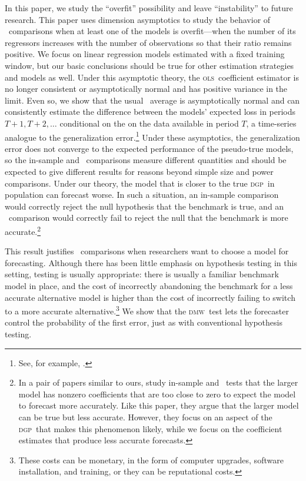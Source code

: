 \documentclass[11pt]{article}
\newcommand{\dmw}{\textsc{dmw}}
\newcommand{\ols}{\textsc{ols}}
\newcommand{\dgp}{\textsc{dgp}}
\begin{document}
In this paper, we study the ``overfit'' possibility and leave
``instability'' to future research. This paper uses dimension
asymptotics to study the behavior of \oos\ comparisons when at least
one of the models is overfit---when the number of its regressors
increases with the number of observations so that their ratio remains
positive.  We focus on linear regression models estimated with a fixed
training window, but our basic conclusions should be true for other
estimation strategies and models as well.  Under this asymptotic
theory, the \ols\ coefficient estimator is no longer consistent or
asymptotically normal \citep{Hub:73} and has positive variance in the
limit.  Even so, we show that the usual \oos\ average is
asymptotically normal and can consistently estimate the difference
between the models' expected loss in periods $T+1,T+2,\dots$
conditional on the on the data available in period $T$, a time-series
analogue to the generalization error.\footnote{See, for example,
  \citet{HTF:08}.}  Under these asymptotics, the generalization error
does not converge to the expected performance of the pseudo-true
models, so the in-sample and \oos\ comparisons measure different
quantities and should be expected to give different results for
reasons beyond simple size and power comparisons.  Under our theory,
the model that is closer to the true \dgp\ in population can forecast
worse.  In such a situation, an in-sample comparison would correctly
reject the null hypothesis that the benchmark is true, and an \oos\
comparison would correctly fail to reject the null that the benchmark
is more accurate.\footnote{In a pair of papers similar to ours,
  \citet{ClM:09,ClM:09b} study in-sample and \oos\ tests that the
  larger model has nonzero coefficients that are too close to zero to
  expect the model to forecast more accurately.  Like this paper, they
  argue that the larger model can be true but less accurate.  However,
  they focus on an aspect of the \dgp\ that makes this phenomenon
  likely, while we focus on the coefficient estimates that produce
  less accurate forecasts.}

This result justifies \oos\ comparisons when researchers want to
choose a model for forecasting.  Although there has been little
emphasis on hypothesis testing in this setting, testing is usually
appropriate: there is usually a familiar benchmark model in place, and
the cost of incorrectly abandoning the benchmark for a less accurate
alternative model is higher than the cost of incorrectly failing to
switch to a more accurate alternative.\footnote{These costs can be
  monetary, in the form of computer upgrades, software installation,
  and training, or they can be reputational costs.}
We show that the \dmw\ test lets the forecaster control the
probability of the first error, just as with conventional hypothesis
testing.  
\end{document}

